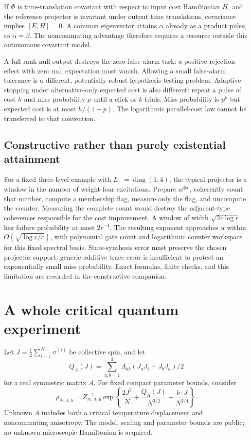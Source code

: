 \documentclass[11pt]{article}
\begin{document}
If $\Phi$ is time-translation covariant with respect to input cost Hamiltonian $H$, and the reference projector is invariant under output time translations, covariance implies $[E,H]=0$. A common eigenvector attains $\alpha$ already as a product pulse, so $\alpha=\beta$. The noncommuting advantage therefore requires a resource outside this autonomous covariant model.

A full-rank null output destroys the zero-false-alarm task: a positive rejection effect with zero null expectation must vanish. Allowing a small false-alarm tolerance is a different, potentially robust hypothesis-testing problem. Adaptive stopping under alternative-only expected cost is also different: repeat a pulse of cost $h$ and miss probability $p$ until a click or $k$ trials. Miss probability is $p^k$ but expected cost is at most $h/(1-p)$. The logarithmic parallel-cost law cannot be transferred to that convention.

\subsection{Constructive rather than purely existential attainment}
For a fixed three-level example with $L_+=\operatorname{diag}(1,4)$, the typical projector is a window in the number of weight-four excitations. Prepare $w^{\otimes r}$, coherently count that number, compute a membership flag, measure only the flag, and uncompute the counter. Measuring the complete count would destroy the adjacent-type coherences responsible for the cost improvement. A window of width $\sqrt{2r\log r}$ has failure probability at most $2r^{-4}$. The resulting exponent approaches $\alpha$ within $O(\sqrt{\log r/r})$, with polynomial gate count and logarithmic counter workspace for this fixed spectral basis. State-synthesis error must preserve the chosen projector support; generic additive trace error is insufficient to protect an exponentially small miss probability. Exact formulas, finite checks, and this limitation are recorded in the constructive companion.

\section{A whole critical quantum experiment}\label{sec:gibbs}
Let $J=\tfrac12\sum_{i=1}^N\sigma^{(i)}$ be collective spin, and let
\[
 Q_A(J)=\sum_{a,b=1}^3 A_{ab}(J_aJ_b+J_bJ_a)/2
\]
for a real symmetric matrix $A$. For fixed compact parameter bounds, consider
\[
 \rho_{N,A,b}=Z_{N,A,b}^{-1}
 \exp\left\{\frac{2J^2}{N}+
 \frac{Q_A(J)}{N^{3/2}}+\frac{b\cdot J}{N^{3/4}}\right\}.
\]
Unknown $A$ includes both a critical temperature displacement and noncommuting anisotropy. The model, scaling and parameter bounds are public; no unknown microscopic Hamiltonian is acquired.
\end{document}
